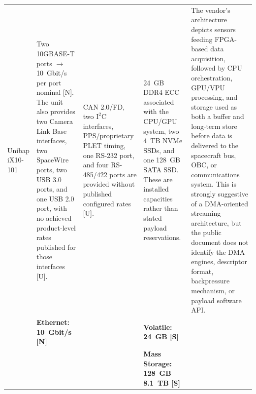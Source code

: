 \documentclass[10pt]{../datasheet}
\let\cite\citep
\begin{document}
\begin{landscape}
\begin{longtable}{|p{3.2cm}|p{4.5cm}|p{4.5cm}|p{4.5cm}|p{5.5cm}|}
    Unibap iX10-101 \cite{unibap_ix10_101_ds}                          &
    Two 10GBASE-T ports $\rightarrow$ 10~Gbit/s per port nominal [N]. The unit
    also provides two Camera Link Base interfaces, two SpaceWire ports, two USB
    3.0 ports, and one USB 2.0 port, with no achieved product-level rates
    published for those interfaces [U].
                                                                       & CAN 2.0/FD, two $\text{I}^2\text{C}$ interfaces, PPS/proprietary PLET
    timing, one RS-232 port, and four RS-485/422 ports are provided without
    published configured rates [U].                                    & 24~GB DDR4 ECC
    associated with the CPU/GPU system, two 4~TB NVMe SSDs, and one 128~GB SATA
    SSD. These are installed capacities rather than stated payload reservations.
                                                                       & The vendor's architecture depicts sensors feeding FPGA-based data
    acquisition, followed by CPU orchestration, GPU/VPU processing, and storage
    used as both a buffer and long-term store before data is delivered to the
    spacecraft bus, OBC, or communications system. This is strongly suggestive
    of a DMA-oriented streaming architecture, but the public document does not
    identify the DMA engines, descriptor format, backpressure mechanism, or
    payload software API.                                                                                                                                                                                                                            \\
    \cline{2-5}
                                                                       & \textbf{Ethernet: 10~Gbit/s [N]}
                                                                       &
                                                                       & \textbf{Volatile: 24~GB [S]}                                               &                                                                                                \\
                                                                       &                                                                            &                                                  & \textbf{Mass Storage: 128~GB--8.1~TB [S]} & \\ \hline\hline


\end{longtable}
\end{landscape}
\end{document}
